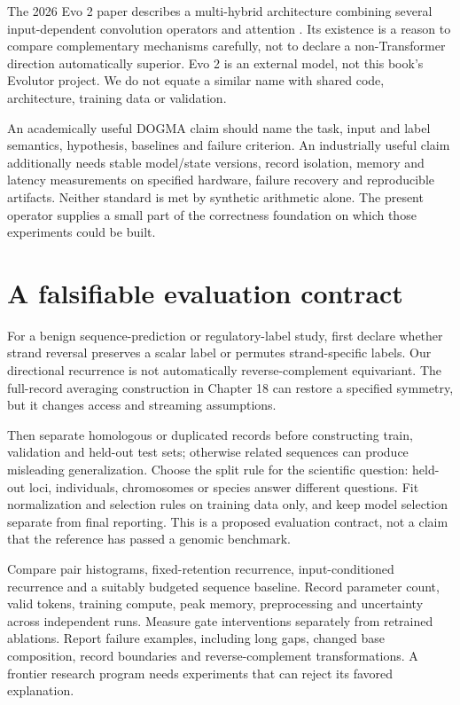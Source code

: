The 2026 Evo 2 paper describes a multi-hybrid architecture combining several
input-dependent convolution operators and attention \cite{evo2}. Its existence
is a reason to compare complementary mechanisms carefully, not to declare a
non-Transformer direction automatically superior. Evo 2 is an external model,
not this book's Evolutor project. We do not equate a similar name with shared
code, architecture, training data or validation.

An academically useful DOGMA claim should name the task, input and label
semantics, hypothesis, baselines and failure criterion. An industrially useful
claim additionally needs stable model/state versions, record isolation, memory
and latency measurements on specified hardware, failure recovery and reproducible
artifacts. Neither standard is met by synthetic arithmetic alone. The present
operator supplies a small part of the correctness foundation on which those
experiments could be built.

\section{A falsifiable evaluation contract}
For a benign sequence-prediction or regulatory-label study, first declare
whether strand reversal preserves a scalar label or permutes strand-specific
labels. Our directional recurrence is not automatically reverse-complement
equivariant. The full-record averaging construction in Chapter 18 can restore
a specified symmetry, but it changes access and streaming assumptions.

Then separate homologous or duplicated records before constructing train,
validation and held-out test sets; otherwise related sequences can produce
misleading generalization. Choose the split rule for the scientific question:
held-out loci, individuals, chromosomes or species answer different questions.
Fit normalization and selection rules on training data only, and keep model
selection separate from final reporting. This is a proposed evaluation contract,
not a claim that the reference has passed a genomic benchmark.

Compare pair histograms, fixed-retention recurrence, input-conditioned recurrence
and a suitably budgeted sequence baseline. Record parameter count, valid tokens,
training compute, peak memory, preprocessing and uncertainty across independent
runs. Measure gate interventions separately from retrained ablations. Report
failure examples, including long gaps, changed base composition, record boundaries
and reverse-complement transformations. A frontier research program needs
experiments that can reject its favored explanation.

